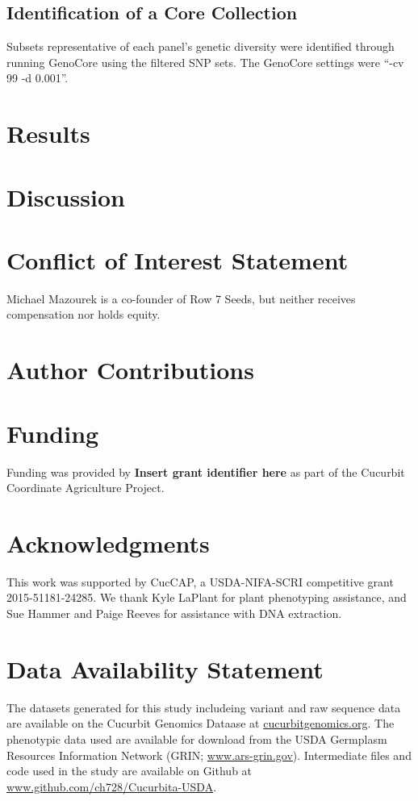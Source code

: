 \documentclass[utf8]{FrontiersinHarvard} %
\begin{document}
\subsection{Identification of a Core Collection}
Subsets representative of each panel’s genetic diversity were identified through running GenoCore \citep{Jeong2017} using the filtered SNP sets. The GenoCore settings were “-cv 99 -d 0.001”.


\section{Results}

\section{Discussion}


\section*{Conflict of Interest Statement}
Michael Mazourek is a co-founder of Row 7 Seeds, but neither receives compensation nor holds equity.

\section*{Author Contributions}



\section*{Funding}

Funding was provided by \textbf{Insert grant identifier here} as part of the Cucurbit Coordinate Agriculture Project.

\section*{Acknowledgments}
This work was supported by CucCAP, a USDA-NIFA-SCRI competitive grant 2015-51181-24285. We thank Kyle LaPlant for plant phenotyping assistance, and Sue Hammer and Paige Reeves for assistance with DNA extraction.

\section*{Data Availability Statement}
The datasets generated for this study includeing variant and raw sequence data are available on the Cucurbit Genomics Dataase at \href{https://cucurbitgenomics.org}{cucurbitgenomics.org}. The phenotypic data used are available for download from the USDA Germplasm Resources Information Network (GRIN; \href{https://www.ars-grin.gov}{www.ars-grin.gov}). Intermediate files and code used in the study are available on Github at \href{https://www.github.com/ch728/Cucurbita-USDA}{www.github.com/ch728/Cucurbita-USDA}.
\end{document}

